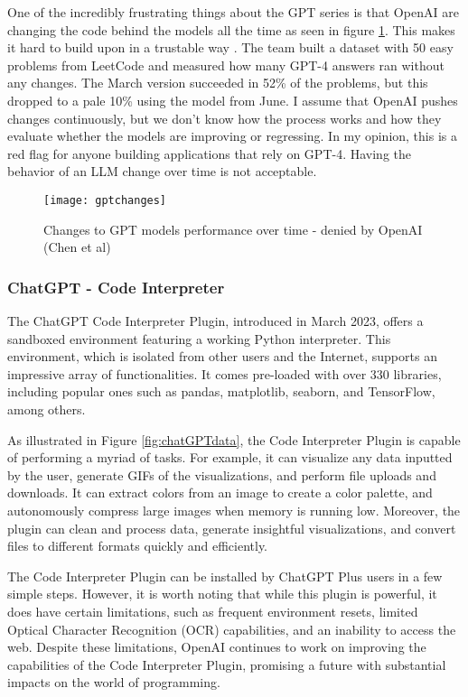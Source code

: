 One of the incredibly frustrating things about the GPT series is that OpenAI are changing the code behind the models all the time as seen in figure \ref{fig:GPTchanges}. This makes it hard to build upon in a trustable way \cite{chen2023chatgpts}.
The team built a dataset with 50 easy problems from LeetCode and measured how many GPT-4 answers ran without any changes. The March version succeeded in 52\% of the problems, but this dropped to a pale 10\% using the model from June. I assume that OpenAI pushes changes continuously, but we don't know how the process works and how they evaluate whether the models are improving or regressing.
In my opinion, this is a red flag for anyone building applications that rely on GPT-4. Having the behavior of an LLM change over time is not acceptable.

\begin{figure}[H]
    \centering
    \texttt{[image: gptchanges]}
    \caption{Changes to GPT models performance over time - denied by OpenAI (Chen et al) \cite{chen2023chatgpts}}
    \label{fig:GPTchanges}
\end{figure}

 
\subsubsection{ChatGPT - Code Interpreter}
The ChatGPT Code Interpreter Plugin, introduced in March 2023, offers a sandboxed environment featuring a working Python interpreter. This environment, which is isolated from other users and the Internet, supports an impressive array of functionalities. It comes pre-loaded with over 330 libraries, including popular ones such as pandas, matplotlib, seaborn, and TensorFlow, among others.

As illustrated in Figure \ref{fig:chatGPTdata}, the Code Interpreter Plugin is capable of performing a myriad of tasks. For example, it can visualize any data inputted by the user, generate GIFs of the visualizations, and perform file uploads and downloads. It can extract colors from an image to create a color palette, and autonomously compress large images when memory is running low. Moreover, the plugin can clean and process data, generate insightful visualizations, and convert files to different formats quickly and efficiently.

The Code Interpreter Plugin can be installed by ChatGPT Plus users in a few simple steps. However, it is worth noting that while this plugin is powerful, it does have certain limitations, such as frequent environment resets, limited Optical Character Recognition (OCR) capabilities, and an inability to access the web. Despite these limitations, OpenAI continues to work on improving the capabilities of the Code Interpreter Plugin, promising a future with substantial impacts on the world of programming.

